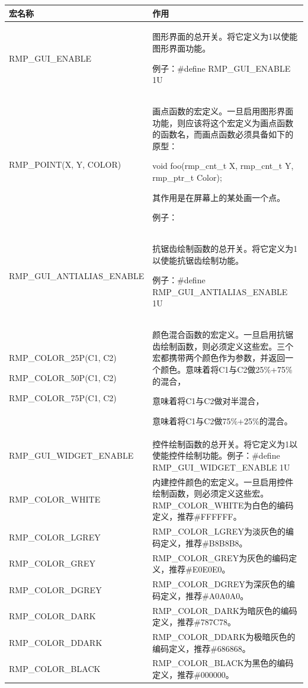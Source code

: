 {\def\LTcaptype{none} %
\begin{longtable}[]{@{}
  >{\raggedright\arraybackslash}p{}
  >{\raggedright\arraybackslash}p{}@{}}
\toprule\noalign{}
\begin{minipage}[b]{\linewidth}\raggedright
宏名称
\end{minipage} & \begin{minipage}[b]{\linewidth}\raggedright
作用
\end{minipage} \\
\midrule\noalign{}
\endhead
\bottomrule\noalign{}
\endlastfoot
RMP\_GUI\_ENABLE & 图形界面的总开关。将它定义为1以使能图形界面功能。

例子：\#define RMP\_GUI\_ENABLE 1U \\
RMP\_POINT(X, Y, COLOR) &
画点函数的宏定义。一旦启用图形界面功能，则应该将这个宏定义为画点函数的函数名，而画点函数必须具备如下的原型：

void foo(rmp\_cnt\_t X, rmp\_cnt\_t Y, rmp\_ptr\_t Color);

其作用是在屏幕上的某处画一个点。

例子： \\
RMP\_GUI\_ANTIALIAS\_ENABLE &
抗锯齿绘制函数的总开关。将它定义为1以使能抗锯齿绘制功能。

例子：\#define RMP\_GUI\_ANTIALIAS\_ENABLE 1U \\
RMP\_COLOR\_25P(C1, C2)

RMP\_COLOR\_50P(C1, C2)

RMP\_COLOR\_75P(C1, C2) &
颜色混合函数的宏定义。一旦启用抗锯齿绘制函数，则必须定义这些宏。三个宏都携带两个颜色作为参数，并返回一个颜色。意味着将C1与C2做25\%+75\%的混合，

意味着将C1与C2做对半混合，

意味着将C1与C2做75\%+25\%的混合。 \\
RMP\_GUI\_WIDGET\_ENABLE & 控件绘制函数的总开关。将它定义为1以使能控件绘制功能。例子：\#define RMP\_GUI\_WIDGET\_ENABLE 1U \\
RMP\_COLOR\_WHITE & 内建控件颜色的宏定义。一旦启用控件绘制函数，则必须定义这些宏。RMP\_COLOR\_WHITE为白色的编码定义，推荐\#FFFFFF。 \\
RMP\_COLOR\_LGREY & RMP\_COLOR\_LGREY为淡灰色的编码定义，推荐\#B8B8B8。 \\
RMP\_COLOR\_GREY & RMP\_COLOR\_GREY为灰色的编码定义，推荐\#E0E0E0。 \\
RMP\_COLOR\_DGREY & RMP\_COLOR\_DGREY为深灰色的编码定义，推荐\#A0A0A0。 \\
RMP\_COLOR\_DARK & RMP\_COLOR\_DARK为暗灰色的编码定义，推荐\#787C78。 \\
RMP\_COLOR\_DDARK & RMP\_COLOR\_DDARK为极暗灰色的编码定义，推荐\#686868。 \\
RMP\_COLOR\_BLACK & RMP\_COLOR\_BLACK为黑色的编码定义，推荐\#000000。 \\
\end{longtable}
}

